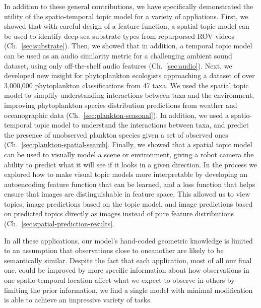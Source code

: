 In addition to these general contributions, we have specifically demonstrated the utility of the spatio-temporal topic model for a variety of appliations. First, we showed that with careful design of a feature function, a spatial topic model can be used to identify deep-sea substrate types from repurporsed ROV videos (Ch.~\ref{sec:substrate}). Then, we showed that in addition, a temporal topic model can be used as an audio similarity metric for a challenging ambient sound dataset, using only off-the-shelf audio features (Ch.~\ref{sec:audio}). Next, we developed new insight for phytoplankton ecologists approaching a dataset of over 3,000,000 phytoplankton classifications from 47 taxa. We used the spatial topic model to simplify understanding interactions between taxa and the environment, improving phytoplankton species distribution predictions from weather and oceanographic data (Ch.~\ref{sec:plankton-seasonal}). In addition, we used a spatio-temporal topic model to understand the interactions between taxa, and predict the presence of unobserved plankton species given a set of observed ones (Ch.~\ref{sec:plankton-spatial-search}. Finally, we showed that a spatial topic model can be used to visually model a scene or environment, giving a robot camera the ability to predict what it will see if it looks in a given direction. In the process we explored how to make visual topic models more interpretable by developing an autoencoding feature function that can be learned, and a loss function that helps ensure that images are distinguishable in feature space. This allowed us to view topics, image predictions based on the topic model, and image predictions based on predicted topics directly as images instead of pure feature distributions (Ch.~\ref{sec:spatial-prediction-results}.

In all these applications, our model's hand-coded geometric knowledge is limited to an assumption that observations close to oneanother are likely to be semantically similar. Despite the fact that each application, most of all our final one, could be improved by more specific information about how observations in one spatio-temporal location affect what we expect to observe in others by limiting the prior information, we find a single model with minimal modification is able to achieve an impressive variety of tasks.

